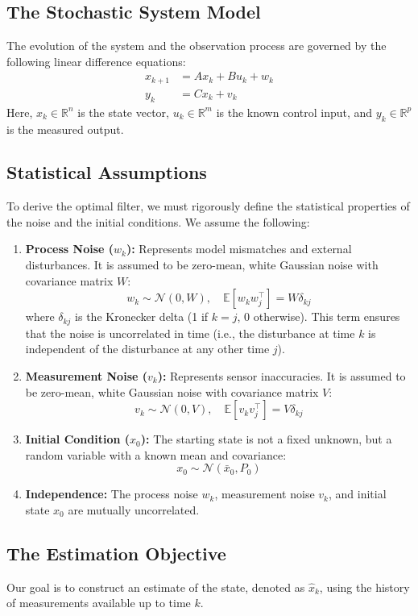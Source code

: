 \subsection{The Stochastic System Model}
The evolution of the system and the observation process are governed by the following linear difference equations:
\begin{align*}
	x_{k+1} &= A x_k + B u_k + w_k \\
	y_k &= C x_k + v_k
\end{align*}
Here, $x_k \in \mathbb{R}^n$ is the state vector, $u_k \in \mathbb{R}^m$ is the known control input, and $y_k \in \mathbb{R}^p$ is the measured output.

\subsection{Statistical Assumptions}
To derive the optimal filter, we must rigorously define the statistical properties of the noise and the initial conditions. We assume the following:

\begin{enumerate}
\item \textbf{Process Noise ($w_k$):} Represents model mismatches and external disturbances. It is assumed to be zero-mean, white Gaussian noise with covariance matrix $W$:
\[ w_k \sim \mathcal{N}(0, W), \quad \mathbb{E}[w_k w_j^\top] = W \delta_{kj} \]
where $\delta_{kj}$ is the Kronecker delta (1 if $k=j$, 0 otherwise). This term ensures that the noise is uncorrelated in time (i.e., the disturbance at time $k$ is independent of the disturbance at any other time $j$).
	
	\item \textbf{Measurement Noise ($v_k$):} Represents sensor inaccuracies. It is assumed to be zero-mean, white Gaussian noise with covariance matrix $V$:
	\[ v_k \sim \mathcal{N}(0, V), \quad \mathbb{E}[v_k v_j^\top] = V \delta_{kj} \]
	
	\item \textbf{Initial Condition ($x_0$):} The starting state is not a fixed unknown, but a random variable with a known mean and covariance:
	\[ x_0 \sim \mathcal{N}(\bar{x}_0, P_0) \]
	
	\item \textbf{Independence:} The process noise $w_k$, measurement noise $v_k$, and initial state $x_0$ are mutually uncorrelated.
\end{enumerate}

\subsection{The Estimation Objective}
Our goal is to construct an estimate of the state, denoted as $\hat{x}_k$, using the history of measurements available up to time $k$.

